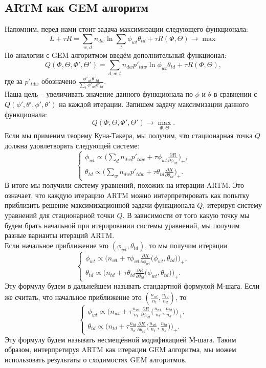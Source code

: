 \documentclass[12pt]{article}
\begin{document}
	\subsection{ARTM как GEM алгоритм}
	Напомним,  перед нами стоит задача максимизации следующего функционала:
\[
L + \tau R = \sum_{w,d} n_{dw} \ln\sum_t \phi_{wt} \theta_{td} + \tau R(\Phi, \Theta) \to \max
\]
По аналогии с GEM алгоритмом введём дополнительный функционал:
\[
	Q(\Phi, \Theta, \Phi', \Theta') = \sum\limits_{d, w, t} n_{dw} p'_{tdw} \ln{\phi_{wt}\theta_{td}} + \tau R(\Phi, \Theta),
\]
где за $p'_{tdw}$ обозначено $\frac{\phi'_{wt} \theta'_{td}}{\sum\limits_t \phi'_{wt} \theta'_{td}}$.\\
Наша цель -- увеличивать значение данного функционала по $\phi$ и $\theta$ в сравнении с $Q(\phi', \theta', \phi', \theta')$ на каждой итерации. Запишем задачу максимизации данного функционала:
\[
Q(\Phi, \Theta, \Phi', \Theta') \to \max_{\Phi, \Theta}.
\]
Если мы применим теорему Куна-Такера, мы получим, что стационарная точка $Q$ должна удовлетворять следующей системе:
\[
\left\{
	\begin{aligned}
		\phi_{wt} \propto \bigg( \sum\limits_d n_{dw} p'_{tdw} + \tau\phi_{wt} \frac{\partial{R}}{\partial{\phi_{wt}}} \bigg)_{+},\\
		\theta_{td} \propto \bigg( \sum\limits_w n_{dw} p'_{tdw} + \tau\theta_{td} \frac{\partial{R}}{\partial{\theta_{td}}} \bigg)_{+}.
	\end{aligned}
\right.
\]
В итоге мы получили систему уравнений, похожих на итерации ARTM. Это означает, что каждую итерацию ARTM можно интерпретировать как попытку приблизить решение максимизационной задачи функционала $Q$, итерируя систему уравнений для стационарной точки $Q$. В зависимости от того какую точку мы будем брать начальной при итерировании системы уравнений, мы получим разные варианты итераций ARTM.\\
Если начальное приближение это $(\phi_{wt}, \theta_{td})$, то мы получим итерации
\[
\left\{
	\begin{aligned}
		\phi_{wt} \propto \bigg( n_{wt} + \tau\phi_{wt} \frac{\partial{R}}{\partial{\phi_{wt}}} \big( \phi_{wt}, \theta_{td}\big) \bigg)_{+},\\
		\theta_{td} \propto \bigg( n_{td} + \tau\theta_{td} \frac{\partial{R}}{\partial{\theta_{td}}} \big( \phi_{wt}, \theta_{td}\big) \bigg)_{+}.
	\end{aligned}
\right.
\]
Эту формулу будем в дальнейшем называть стандартной формулой М-шага. Если же считать, что начальное приближение это $(\frac{n_{wt}}{n_t}, \frac{n_{td}}{n_d})$, то
\[
\left\{
	\begin{aligned}
		\phi_{wt} \propto \bigg( n_{wt} + \tau \frac{n_{wt}}{n_t} \frac{\partial{R}}{\partial{\phi_{wt}}} \big(\frac{n_{wt}}{n_t}, \frac{n_{td}}{n_d}\big) \bigg)_{+},\\
		\theta_{td} \propto \bigg(n_{td} + \tau \frac{n_{td}}{n_d} \frac{\partial{R}}{\partial{\theta_{td}}} \big(\frac{n_{wt}}{n_t}, \frac{n_{td}}{n_d}\big) \bigg)_{+}.
	\end{aligned}
\right.
\]
Эту формулу будем называть несмещённой модификацией М-шага. Таким образом, интерпретируя ARTM как итерации GEM алгоритма, мы можем использовать результаты о сходимостях GEM алгоритмов.
\end{document}

